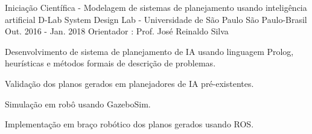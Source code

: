 


\begin{cventries}


\cventry
{Iniciação Científica - Modelagem de sistemas de planejamento usando inteligência artificial} %
{D-Lab System Design Lab - Universidade de São Paulo } %
{São Paulo-Brasil} %
{Out. 2016 -  Jan. 2018} %
{Orientador : Prof. José Reinaldo Silva}
{ %
\begin{cvitems}
\item {Desenvolvimento de sistema de planejamento de IA usando linguagem Prolog, heurísticas e métodos formais de descrição de problemas.}
\item {Validação dos planos gerados em planejadores de IA pré-existentes.}
\item {Simulação em robô usando GazeboSim.}
\item {Implementação em braço robótico dos planos gerados usando ROS.}
\end{cvitems}
}

\vspace*{5mm}




\end{cventries}
